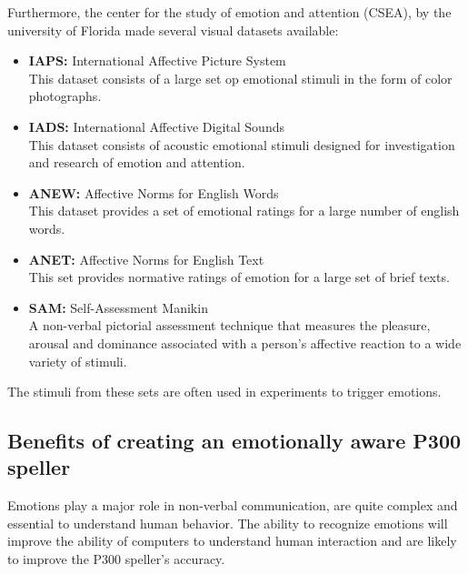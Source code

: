 Furthermore, the center for the study of emotion and attention (CSEA), by the university of Florida made several visual datasets available:
\begin{itemize}
\item \textbf{IAPS:} International Affective Picture System\\
This dataset consists of a large set op emotional stimuli in the form of color photographs.
\item \textbf{IADS:} International Affective Digital Sounds \\
This dataset consists of acoustic emotional stimuli designed for investigation and research of emotion and attention.
\item \textbf{ANEW:} Affective Norms for English Words\\
This dataset provides a set of emotional ratings for a large number of english words.
\item \textbf{ANET:} Affective Norms for English Text\\
This set provides normative ratings of emotion for a large set of brief texts.
\item \textbf{SAM:} Self-Assessment Manikin\\
A non-verbal pictorial assessment technique that measures the pleasure, arousal and dominance associated with a person's affective reaction to a wide variety of stimuli.
\end{itemize}
The stimuli from these sets are often used in experiments to trigger emotions\cite{ExtendedPaper, EmotionSite, RealTimeEEGEmotion, EEGDatasets}.


\subsection{Benefits of creating an emotionally aware P300 speller}

Emotions play a major role in non-verbal communication, are quite complex and essential to understand human behavior. The ability to recognize emotions will improve the ability of computers to understand human interaction\cite{CompRecognizeEmotion} and are likely to improve the P300 speller's accuracy.

